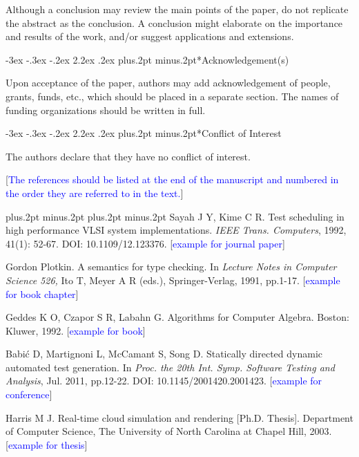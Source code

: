 \documentclass[twoside]{article}
\makeatletter
\def\section{\@startsection{section}{1}{\z@}%
 {-3ex \@plus -.3ex \@minus -.2ex}%
 {2.2ex \@plus.2ex}%
{\normalfont\normalsize\protect\baselineskip=14.5pt plus.2pt minus.2pt\bfseries}}
\makeatother
\begin{document}
\begin{multicols}{2}
Although a conclusion may review the main points of the paper, do not replicate the abstract as the conclusion. A conclusion might elaborate on the importance and results of the work, and/or suggest applications and extensions.

\section*{Acknowledgement(s)}

Upon acceptance of the paper, authors may add acknowledgement of people, grants, funds, etc., which should be placed in a separate section. The names of funding organizations should be written in full.

\section*{Conflict of Interest}

The authors declare that they have no conflict of interest.

[\textcolor{blue}{The references should be listed at the end of the manuscript and numbered in the order they are referred to in the text.}]

\begin{thebibliography}{99}
\footnotesize
\itemsep=-3pt plus.2pt minus.2pt
\baselineskip=14pt plus.2pt minus.2pt
Sayah J Y, Kime C R. Test scheduling in high performance VLSI system implementations. {\it IEEE Trans. Computers}, 1992, 41(1): 52-67. DOI: 10.1109/12.123376. [\textcolor{blue}{example for journal paper}]

 Gordon Plotkin. A semantics for type checking. In {\it Lecture Notes in Computer Science 526,} Ito T, Meyer A R (eds.), Springer-Verlag, 1991, pp.1-17. [\textcolor{blue}{example for book chapter}]

 Geddes K O, Czapor S R, Labahn G. Algorithms for Computer Algebra. Boston: Kluwer, 1992. [\textcolor{blue}{example for book}]

 Babi\'{c} D, Martignoni L, McCamant S, Song D. Statically directed dynamic automated test generation. In {\it Proc. the 20th Int. Symp. Software Testing and Analysis}, Jul. 2011, pp.12-22. DOI: 10.1145/2001420.2001423. [\textcolor{blue}{example for conference}]

 Harris M J. Real-time cloud simulation and rendering [Ph.D. Thesis]. Department of Computer Science, The University of North Carolina at Chapel Hill, 2003. [\textcolor{blue}{example for thesis}]


\end{thebibliography}
\end{multicols}
\end{document}
